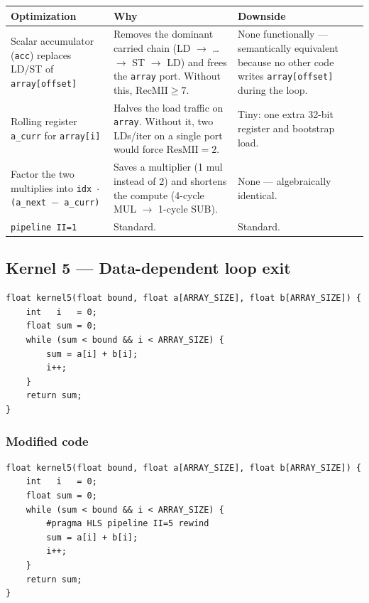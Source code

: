 \documentclass[11pt,a4paper]{article}
\begin{document}
\begin{center}
\begin{tabular}{p{3.4cm} p{6cm} p{4.8cm}}
\toprule
Optimization & Why & Downside \\
\midrule
Scalar accumulator (\texttt{acc}) replaces LD/ST of \texttt{array[offset]} & Removes the dominant carried chain (LD $\to$ \dots\ $\to$ ST $\to$ LD) and frees the \texttt{array} port. Without this, $\mathrm{RecMII} \geq 7$. & None functionally --- semantically equivalent because no other code writes \texttt{array[offset]} during the loop. \\
\addlinespace
Rolling register \texttt{a\_curr} for \texttt{array[i]} & Halves the load traffic on \texttt{array}. Without it, two LDs/iter on a single port would force $\mathrm{ResMII} = 2$. & Tiny: one extra 32-bit register and bootstrap load. \\
\addlinespace
Factor the two multiplies into \texttt{idx $\cdot$ (a\_next $-$ a\_curr)} & Saves a multiplier (1 mul instead of 2) and shortens the compute (4-cycle MUL $\to$ 1-cycle SUB). & None --- algebraically identical. \\
\addlinespace
\texttt{pipeline II=1} & Standard. & Standard. \\
\bottomrule
\end{tabular}
\end{center}

\subsection{Kernel 5 --- Data-dependent loop exit}

\begin{lstlisting}
float kernel5(float bound, float a[ARRAY_SIZE], float b[ARRAY_SIZE]) {
    int   i   = 0;
    float sum = 0;
    while (sum < bound && i < ARRAY_SIZE) {
        sum = a[i] + b[i];
        i++;
    }
    return sum;
}
\end{lstlisting}

\subsubsection*{Modified code}

\begin{lstlisting}
float kernel5(float bound, float a[ARRAY_SIZE], float b[ARRAY_SIZE]) {
    int   i   = 0;
    float sum = 0;
    while (sum < bound && i < ARRAY_SIZE) {
        #pragma HLS pipeline II=5 rewind
        sum = a[i] + b[i];
        i++;
    }
    return sum;
}
\end{lstlisting}
\end{document}
